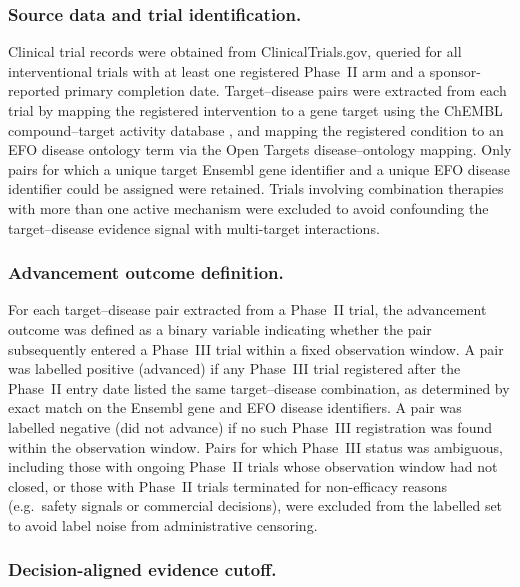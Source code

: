 \documentclass[a4,center]{NAR}
\begin{document}
{\subsubsection{Source data and trial identification.}

Clinical trial records were obtained from ClinicalTrials.gov, queried for
all interventional trials with at least one registered Phase~II arm and a
sponsor-reported primary completion date. Target--disease pairs were
extracted from each trial by mapping the registered intervention to a gene
target using the ChEMBL compound--target activity database
\citep{Gaulton2017The2017}, and mapping the registered condition to an EFO disease
ontology term via the Open Targets disease--ontology mapping. Only pairs
for which a unique target Ensembl gene identifier and a unique EFO disease
identifier could be assigned were retained. Trials involving combination
therapies with more than one active mechanism were excluded to avoid
confounding the target--disease evidence signal with multi-target
interactions.

\subsubsection{Advancement outcome definition.}

For each target--disease pair extracted from a Phase~II trial, the
advancement outcome was defined as a binary variable indicating whether the
pair subsequently entered a Phase~III trial within a fixed observation
window. A pair was labelled positive (advanced) if any Phase~III trial
registered after the Phase~II entry date listed the same target--disease
combination, as determined by exact match on the Ensembl gene and EFO
disease identifiers. A pair was labelled negative (did not advance) if no
such Phase~III registration was found within the observation window. Pairs
for which Phase~III status was ambiguous, including those with ongoing
Phase~II trials whose observation window had not closed, or those with
Phase~II trials terminated for non-efficacy reasons (e.g.\ safety signals
or commercial decisions), were excluded from the labelled set to avoid
label noise from administrative censoring.

\subsubsection{Decision-aligned evidence cutoff.}

}
\end{document}
